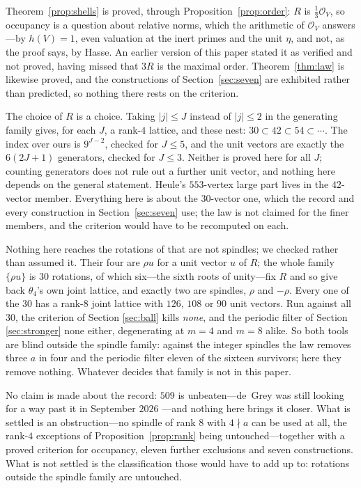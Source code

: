 \documentclass[11pt,reqno]{amsart}
\theoremstyle{plain}
\theoremstyle{definition}
\newcommand{\Lat}{R}
\newcommand{\Ok}{\mathcal{O}}
\begin{document}
Theorem~\ref{prop:shells} is proved, through
Proposition~\ref{prop:order}: $\Lat$ is $\tfrac13\Ok_V$, so occupancy is a
question about relative norms, which the arithmetic of $\Ok_V$ answers---by
$h(V) = 1$, even valuation at the inert primes and the unit $\eta$, and not, as
the proof says, by Hasse. An earlier version of this paper stated it as verified
and not proved, having missed that $3\Lat$ is the maximal order. Theorem~\ref{thm:law} is likewise proved, and the
constructions of Section~\ref{sec:seven} are exhibited rather than predicted, so
nothing there rests on the criterion.

The choice of $\Lat$ is a choice. Taking $\lvert j\rvert \le J$ instead of
$\lvert j\rvert \le 2$ in the generating family gives, for each $J$, a rank-$4$
lattice, and these nest: $30 \subset 42 \subset 54 \subset \cdots$. The index over
ours is $9^{J-2}$, checked for $J \le 5$, and the unit vectors are exactly the
$6(2J+1)$ generators, checked for $J \le 3$. Neither is proved here for all $J$;
counting generators does not rule out a further unit vector, and nothing here
depends on the general statement.
Heule's $553$-vertex large part lives in the $42$-vector member. Everything here
is about the $30$-vector one, which the record and every construction in
Section~\ref{sec:seven} use; the law is not claimed for the finer members, and
the criterion would have to be recomputed on each.

Nothing here reaches the rotations of \cite{Voronov} that are not spindles; we
checked rather than assumed it. Their four are $\rho u$ for a unit vector $u$
of $\Lat$; the whole family $\{\rho u\}$ is $30$ rotations, of which six---the
sixth roots of unity---fix $\Lat$ and so give back $\theta_4$'s own joint lattice,
and exactly two are spindles, $\rho$ and $-\rho$. Every one of the $30$ has a
rank-$8$ joint lattice with $126$, $108$ or $90$ unit vectors. Run against all
$30$, the criterion of Section \ref{sec:ball} kills \emph{none}, and the periodic
filter of Section \ref{sec:stronger} none either, degenerating at $m = 4$ and
$m = 8$ alike. So both tools are blind outside the spindle family: against the
integer spindles the law removes three $a$ in four and the periodic filter eleven
of the sixteen survivors; here they remove nothing. Whatever decides that family
is not in this paper.

No claim is made about the record: $509$ is unbeaten---de~Grey was still
looking for a way past it in September $2026$ \cite{Thread18}---and nothing here
brings it closer. What is settled is an obstruction---no spindle of rank $8$ with
$4 \nmid a$ can be used at all, the rank-$4$ exceptions of
Proposition~\ref{prop:rank} being untouched---together with a proved criterion for
occupancy,
eleven further exclusions and seven constructions. What is not settled is the
classification those would have to add up to: rotations
outside the spindle family are untouched.
\end{document}
